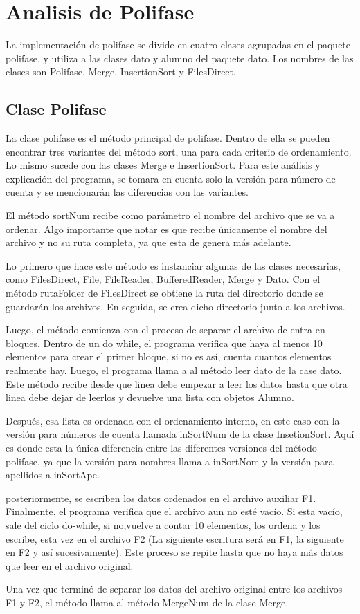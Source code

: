 \documentclass[11pt]{article}
\begin{document}
\section{Analisis de Polifase}
La implementación de polifase se divide en cuatro clases agrupadas en el paquete polifase, y utiliza a las  clases dato y alumno del paquete dato.
Los nombres de las clases son Polifase, Merge, InsertionSort y FilesDirect.

\subsection{Clase Polifase}
La clase polifase es el método principal de polifase. Dentro de ella se pueden encontrar tres variantes del método sort, una para cada criterio de ordenamiento. Lo mismo sucede con las clases Merge e InsertionSort. Para este análisis y explicación del programa, se tomara en cuenta solo la versión para número de cuenta y se mencionarán las diferencias con las variantes.
\par
El método sortNum recibe como parámetro el nombre del archivo que se va a ordenar. Algo importante que notar es que recibe únicamente el nombre del archivo y no su ruta completa, ya que esta de genera más adelante. 
\par
Lo primero que hace este método es instanciar algunas de las clases necesarias, como FilesDirect, File, FileReader, BufferedReader, Merge y Dato. Con el método rutaFolder de FilesDirect se obtiene la ruta del directorio donde se guardarán los archivos. En seguida, se crea dicho directorio junto a los archivos.
\par
Luego, el método comienza con el proceso de separar el archivo de entra en bloques. Dentro de un do while, el programa verifica que haya al menos 10 elementos para crear el primer bloque, si no es así, cuenta cuantos elementos realmente hay. Luego, el programa llama a al método leer dato de la case dato. Este método recibe desde que linea debe empezar a leer los datos hasta que otra linea debe dejar de leerlos y devuelve una lista con objetos Alumno.
\par
Después, esa lista es ordenada con el ordenamiento interno, en este caso con la versión para números de cuenta llamada inSortNum de la clase InsetionSort. Aquí es donde esta la única diferencia entre las diferentes versiones del método polifase, ya que la versión para nombres llama a inSortNom y la versión para apellidos a inSortApe.
\par
posteriormente, se escriben los datos ordenados en el archivo auxiliar F1. Finalmente, el programa verifica que el archivo aun no esté vacío. Si esta vacío, sale del ciclo do-while, si no,vuelve a contar 10 elementos, los ordena y los escribe, esta vez en el archivo F2 (La siguiente escritura será en F1, la siguiente en F2 y así sucesivamente). Este proceso se repite hasta que no haya más datos que leer en el archivo original.
\par
Una vez que terminó de separar los datos del archivo original entre los archivos F1 y F2, el método llama al método MergeNum de la clase Merge.
\end{document}
